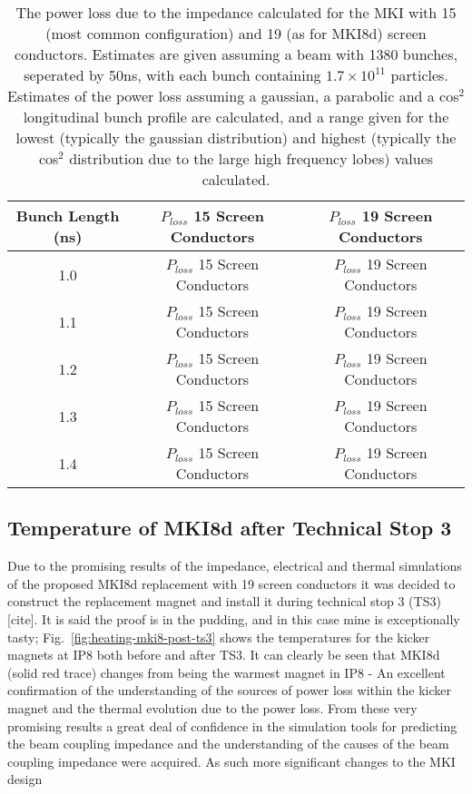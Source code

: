 \begin{table}
\label{tab:heating-15-19-cond}
\caption{The power loss due to the impedance calculated for the MKI with 15 (most common configuration) and 19 (as for MKI8d) screen conductors. Estimates are given assuming a beam with 1380 bunches, seperated by 50ns, with each bunch containing $1.7 \times 10^{11}$ particles. Estimates of the power loss assuming a gaussian, a parabolic and a cos$^{2}$ longitudinal bunch profile are calculated, and a range given for the lowest (typically the gaussian distribution) and highest (typically the cos$^{2}$ distribution due to the large high frequency lobes) values calculated.}
\begin{center}
\begin{tabular}{c | c | c}
Bunch Length (ns) & $P_{loss}$ 15 Screen Conductors & $P_{loss}$ 19 Screen Conductors \\ \hline
1.0 & $P_{loss}$ 15 Screen Conductors & $P_{loss}$ 19 Screen Conductors \\ \hline
1.1 & $P_{loss}$ 15 Screen Conductors & $P_{loss}$ 19 Screen Conductors \\ \hline
1.2 & $P_{loss}$ 15 Screen Conductors & $P_{loss}$ 19 Screen Conductors \\ \hline
1.3 & $P_{loss}$ 15 Screen Conductors & $P_{loss}$ 19 Screen Conductors \\ \hline
1.4 & $P_{loss}$ 15 Screen Conductors & $P_{loss}$ 19 Screen Conductors \\ \hline
\end{tabular}
\end{center}
\end{table}

\subsection{Temperature of MKI8d after Technical Stop 3}

Due to the promising results of the impedance, electrical and thermal simulations of the proposed MKI8d replacement with 19 screen conductors it was decided to construct the replacement magnet and install it during technical stop 3 (TS3)[cite]. It is said the proof is in the pudding, and in this case mine is exceptionally tasty; Fig.~\ref{fig:heating-mki8-post-ts3} shows the temperatures for the kicker magnets at IP8 both before and after TS3. It can clearly be seen that MKI8d (solid red trace) changes from being the warmest magnet in IP8 - An excellent confirmation of the understanding of the sources of power loss within the kicker magnet and the thermal evolution due to the power loss. From these very promising results a great deal of confidence in the simulation tools for predicting the beam coupling impedance and the understanding of the causes of the beam coupling impedance were acquired. As such more significant changes to the MKI design

